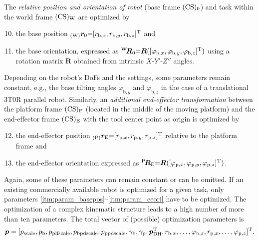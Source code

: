 The \emph{relative position and orientation of robot} (base frame $(\mathrm{CS})_{\mathrm{0}}$) and task within the world frame $(\mathrm{CS})_{\mathrm{W}}$ are optimized by
\begin{enumerate}
\setcounter{enumi}{9}
\item \label{itm:param_basepos} the base position ${_{(\mathrm{W})}\boldsymbol{r}_{{0}}}{=}[r_{\mathrm{b},x},r_{\mathrm{b},y},r_{\mathrm{b},z}]^{\mathrm{T}}$ and
\item \label{itm:param_baseori} the base orientation, expressed as ${^{\mathrm{W}\!}\boldsymbol{R}}_{0}{=}\bm{R}([\varphi_{\mathrm{b},x},\varphi_{\mathrm{b},y},\varphi_{\mathrm{b},z}]^{\mathrm{T}})$ using a rotation matrix $\bm{R}$ obtained from intrinsic $X$-$Y'$-$Z''$  angles.
\end{enumerate}
Depending on the robot's DoFs and the settings, some parameters remain constant, e.g., the base tilting angles $\varphi_{\mathrm{b},y}$ and $\varphi_{\mathrm{b},z}$ in the case of a translational 3T0R parallel robot.
Similarly, an \emph{additional end-effector transformation} between the platform frame $(\mathrm{CS})_{\mathrm{P}}$ (located in the middle of the moving platform) and the end-effector frame  $(\mathrm{CS})_{\mathrm{E}}$ with the tool center point as origin is optimized by
\begin{enumerate}
\setcounter{enumi}{11}
\item \label{itm:param_eepos} the end-effector position ${_{(\mathrm{P})}\boldsymbol{r}_{{\mathrm{E}}}}{=}[r_{\mathrm{p},x},r_{\mathrm{p},y},r_{\mathrm{p},z}]^{\mathrm{T}}$ relative to the platform frame and
\item \label{itm:param_eeori} the end-effector orientation expressed as ${^{\mathrm{P}\!}\boldsymbol{R}}_{\mathrm{E}}{=}\bm{R}([\varphi_{\mathrm{p},x},\varphi_{\mathrm{p},y},\varphi_{\mathrm{p},z}]^{\mathrm{T}})$.
\end{enumerate}
%
Again, %
%
some of these parameters can remain constant or can be omitted. %
%
If an existing commercially available robot is optimized for a given task, only parameters \ref*{itm:param_basepos}--\ref*{itm:param_eeori} have to be optimized.
The optimization of a complex kinematic structure leads to a high number of more than ten parameters.
The total vector of (possible) optimization parameters is
\begin{equation}
\bm{p}=[p_\mathrm{scale}, p_\mathrm{b}, p_\mathrm{plfscale}, p_\mathrm{bpdscale}, p_\mathrm{ppdscale}, \gamma_\mathrm{b}, \gamma_\mathrm{p}, \bm{p}_\mathrm{DH}^{\mathrm{T}}, r_{\mathrm{b},x}, \dots, \varphi_{\mathrm{b},z}, r_{\mathrm{p},x}, \dots, \varphi_{\mathrm{p},z}]^{\mathrm{T}}.
\end{equation}
